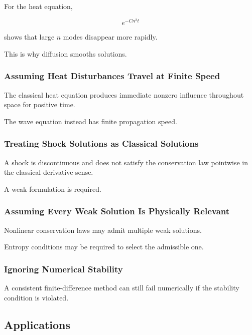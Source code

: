 For the heat equation,

\[
e^{-Cn^2t}
\]

shows that large \(n\) modes disappear more rapidly.

This is why diffusion smooths solutions.

\subsubsection{Assuming Heat Disturbances Travel at Finite Speed}

The classical heat equation produces immediate nonzero influence
throughout space for positive time.

The wave equation instead has finite propagation speed.

\subsubsection{Treating Shock Solutions as Classical Solutions}

A shock is discontinuous and does not satisfy the conservation law
pointwise in the classical derivative sense.

A weak formulation is required.

\subsubsection{Assuming Every Weak Solution Is Physically Relevant}

Nonlinear conservation laws may admit multiple weak solutions.

Entropy conditions may be required to select the admissible one.

\subsubsection{Ignoring Numerical Stability}

A consistent finite-difference method can still fail numerically if the
stability condition is violated.

\subsection{Applications}
\label{subsec:pde-applications}

